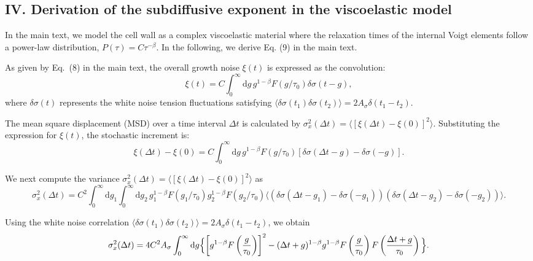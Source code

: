 \documentclass[aps, prl, longbibliography, linenumbers, superscriptaddress]{revtex4-2}
\begin{document}
\subsection{IV. Derivation of the subdiffusive exponent in the viscoelastic model}

In the main text, we model the cell wall as a complex viscoelastic material where the relaxation times of the internal Voigt elements follow a power-law distribution, $P(\tau) = C\tau^{-\beta}$. In the following, we derive Eq. (9) in the main text.


As given by Eq.~(8) in the main text, the overall growth noise $\xi(t)$ is expressed as the convolution:
\begin{equation}
	\xi(t) = C \int_0^{\infty} \mathrm{d}g \, g^{1-\beta} F(g/\tau_0) \delta \sigma(t-g),
\end{equation}
where $\delta \sigma(t)$ represents the white noise tension fluctuations satisfying $\langle \delta \sigma(t_1) \delta \sigma(t_2) \rangle = 2A_{\sigma} \delta(t_1 - t_2)$.

The mean square displacement (MSD) over a time interval $\Delta t$ is calculated by  $\sigma_x^2(\Delta t) = \langle [\xi(\Delta t) - \xi(0)]^2 \rangle$. Substituting the expression for $\xi(t)$, the stochastic increment is:
\begin{equation}
	\xi(\Delta t) - \xi(0) = C \int_0^{\infty} \mathrm{d}g \, g^{1-\beta} F(g/\tau_0) [\delta \sigma(\Delta t - g) - \delta \sigma(-g)].
\end{equation}

We next compute the variance $\sigma_x^2(\Delta t) = \langle [\xi(\Delta t) - \xi(0)]^2 \rangle$ as
\begin{equation}
	\sigma_x^2(\Delta t)= C^2 \int_0^{\infty} \mathrm{d}g_1 \int_0^{\infty} \mathrm{d}g_2 \, g_1^{1-\beta} F(g_1/\tau_0) g_2^{1-\beta} F(g_2/\tau_0) \langle (\delta \sigma(\Delta t - g_1) - \delta \sigma(-g_1)) (\delta \sigma(\Delta t - g_2) - \delta \sigma(-g_2)) \rangle.
\end{equation}

Using the white noise correlation $\langle \delta \sigma(t_1) \delta \sigma(t_2) \rangle = 2A_{\sigma}\delta(t_1 - t_2)$, we obtain
\begin{equation}
	\sigma_x^2(\Delta t) = 4C^2 A_{\sigma}\int_0^{\infty} \mathrm{d}g \Bigl\{ \left[ g^{1-\beta} F\left(\frac{g}{\tau_0}\right) \right]^2- (\Delta t + g)^{1-\beta} g^{1-\beta} F\left(\frac{g}{\tau_0}\right) F\left(\frac{\Delta t + g}{\tau_0}\right)\Bigl\}.
\end{equation}
\end{document}
